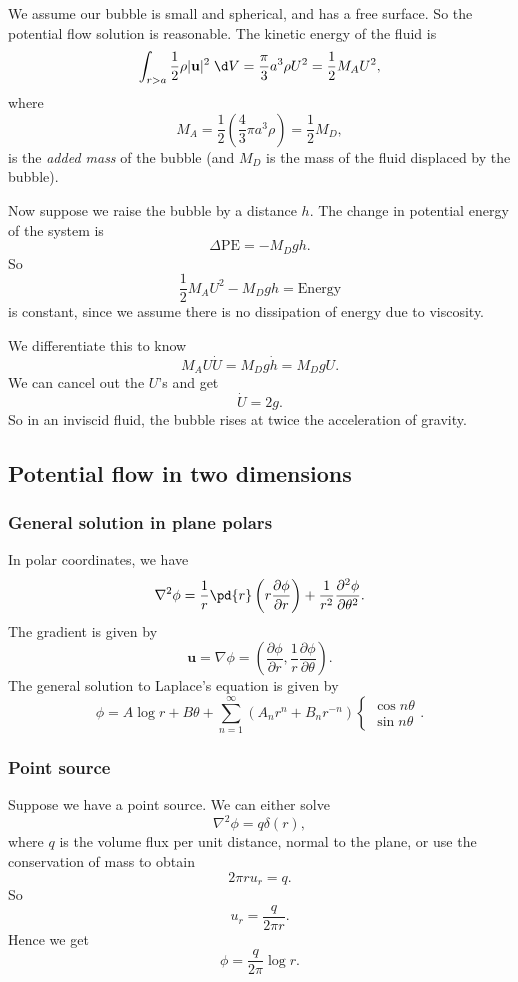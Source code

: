 \documentclass[a4paper]{article}
\begin{document}
\begin{eg}
  We assume our bubble is small and spherical, and has a free surface. So the potential flow solution is reasonable. The kinetic energy of the fluid is
  \[
    \int_{r > a} \frac{1}{2}\rho |\mathbf{u}|^2 \;\d V = \frac{\pi}{3} a^3 \rho U^2 = \frac{1}{2}M_A U^2,
  \]
  where
  \[
    M_A = \frac{1}{2} \left(\frac{4}{3} \pi a^3 \rho\right) = \frac{1}{2} M_D,
  \]
  is the \emph{added mass} of the bubble (and $M_D$ is the mass of the fluid displaced by the bubble).

  Now suppose we raise the bubble by a distance $h$. The change in potential energy of the system is
  \[
    \Delta\mathrm{PE} = -M_D gh.
  \]
  So
  \[
    \frac{1}{2} M_A U^2 - M_D gh = \mathrm{Energy}
  \]
  is constant, since we assume there is no dissipation of energy due to viscosity.

  We differentiate this to know
  \[
    M_A U \dot{U} = M_D g \dot{h} = M_D gU.
  \]
  We can cancel out the $U$'s and get
  \[
    \dot{U} = 2g.
  \]
  So in an inviscid fluid, the bubble rises at twice the acceleration of gravity.
\end{eg}

\subsection{Potential flow in two dimensions}
\subsubsection{General solution in plane polars}
In polar coordinates, we have
\[
  \nabla^2 \phi = \frac{1}{r} \pd{r} \left(r \frac{\partial \phi}{\partial r}\right) + \frac{1}{r^2} \frac{\partial^2 \phi}{\partial \theta^2}.
\]
The gradient is given by
\[
  \mathbf{u} = \nabla \phi = \left(\frac{\partial \phi}{\partial r}, \frac{1}{r} \frac{\partial \phi}{\partial \theta}\right).
\]
The general solution to Laplace's equation is given by
\[
  \phi = A \log r + B \theta + \sum_{n = 1}^\infty (A_n r^n + B_n r^{-n})
  \begin{cases}
    \cos n\theta\\
    \sin n\theta
  \end{cases}.
\]
\subsubsection{Point source}
Suppose we have a point source. We can either solve
\[
  \nabla^2 \phi = q \delta (r),
\]
where $q$ is the volume flux per unit distance, normal to the plane, or use the conservation of mass to obtain
\[
  2\pi r u_r = q.
\]
So
\[
  u_r = \frac{q}{2\pi r}.
\]
Hence we get
\[
  \phi = \frac{q}{2\pi} \log r.
\]
\end{document}
